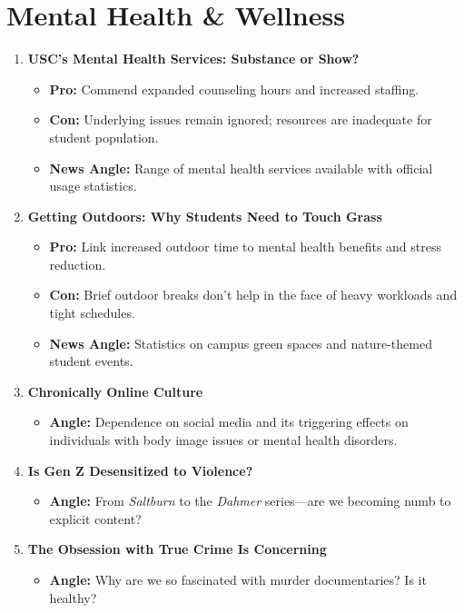 \documentclass{article}
\begin{document}
\section*{Mental Health \& Wellness}

\begin{enumerate}[leftmargin=*]
    \item \textbf{USC's Mental Health Services: Substance or Show?}
    \begin{itemize}
        \item \textbf{Pro:} Commend expanded counseling hours and increased staffing.
        \item \textbf{Con:} Underlying issues remain ignored; resources are inadequate for student population.
        \item \textbf{News Angle:} Range of mental health services available with official usage statistics.
    \end{itemize}

    \item \textbf{Getting Outdoors: Why Students Need to Touch Grass}
    \begin{itemize}
        \item \textbf{Pro:} Link increased outdoor time to mental health benefits and stress reduction.
        \item \textbf{Con:} Brief outdoor breaks don't help in the face of heavy workloads and tight schedules.
        \item \textbf{News Angle:} Statistics on campus green spaces and nature-themed student events.
    \end{itemize}

    \item \textbf{Chronically Online Culture}
    \begin{itemize}
        \item \textbf{Angle:} Dependence on social media and its triggering effects on individuals with body image issues or mental health disorders.
    \end{itemize}

    \item \textbf{Is Gen Z Desensitized to Violence?}
    \begin{itemize}
        \item \textbf{Angle:} From \emph{Saltburn} to the \emph{Dahmer} series---are we becoming numb to explicit content?
    \end{itemize}

    \item \textbf{The Obsession with True Crime Is Concerning}
    \begin{itemize}
        \item \textbf{Angle:} Why are we so fascinated with murder documentaries? Is it healthy?
    \end{itemize}
\end{enumerate}
\end{document}
